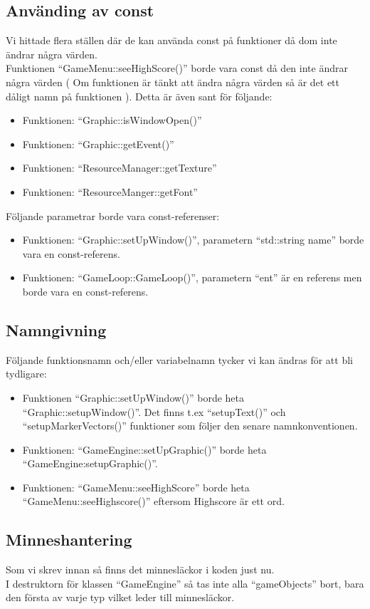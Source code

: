 \documentclass{TDP003mall}
\begin{document}
\subsection{Använding av const}
Vi hittade flera ställen där de kan använda const på funktioner då dom inte ändrar några värden. \\

Funktionen ``GameMenu::seeHighScore()'' borde vara const då den inte ändrar några värden ( Om funktionen är tänkt att ändra några värden så är det ett dåligt namn på funktionen ). Detta är även sant för följande: 
\begin{itemize}
\item Funktionen: ``Graphic::isWindowOpen()''
\item Funktionen: ``Graphic::getEvent()''
\item Funktionen: ``ResourceManager::getTexture''
\item Funktionen: ``ResourceManger::getFont''
\end{itemize}
Följande parametrar borde vara const-referenser:
\begin{itemize}
\item Funktionen: ``Graphic::setUpWindow()'', parametern ``std::string name'' borde vara en const-referens.
\item Funktionen: ``GameLoop::GameLoop()'', parametern ``ent'' är en referens men borde vara en const-referens.
\end{itemize}

\subsection{Namngivning}
Följande funktionsnamn och/eller variabelnamn tycker vi kan ändras för att bli tydligare:
\begin{itemize}
\item Funktionen ``Graphic::setUpWindow()'' borde heta ``Graphic::setupWindow()''. Det finns t.ex ``setupText()'' och ``setupMarkerVectors()'' funktioner som följer den senare namnkonventionen.
\item Funktionen: ``GameEngine::setUpGraphic()'' borde heta ``GameEngine:setupGraphic()''.
\item Funktionen: ``GameMenu::seeHighScore'' borde heta ``GameMenu::seeHighscore()'' eftersom Highscore är ett ord.
\end{itemize}

\subsection{Minneshantering}
Som vi skrev innan så finns det minnesläckor i koden just nu. \\
I destruktorn för klassen ``GameEngine'' så tas inte alla ``gameObjects'' bort, bara den första av varje typ vilket leder till minnesläckor.
\end{document}
